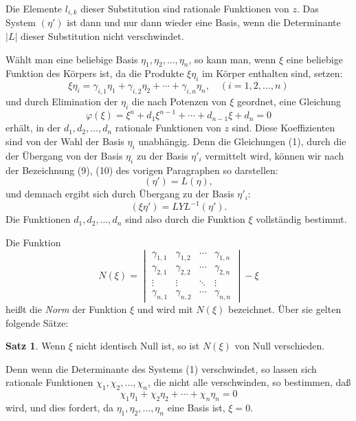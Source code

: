 \documentclass[12pt,a4paper]{article}
\theoremstyle{definition}
\newtheorem{satz}{Satz}[section]
\begin{document}
Die Elemente $l_{i,k}$ dieser Substitution sind rationale Funktionen von $z$. Das System $(\eta')$ ist dann und nur dann wieder eine Basis, wenn die Determinante $|L|$ dieser Substitution nicht verschwindet.

\bigskip

Wählt man eine beliebige Basis $\eta_1, \eta_2, \ldots, \eta_n$, so kann man, wenn $\xi$ eine beliebige Funktion des Körpers ist, da die Produkte $\xi\eta_i$ im Körper enthalten sind, setzen:
\begin{equation}
\xi\eta_i = \gamma_{i,1}\eta_1 + \gamma_{i,2}\eta_2 + \cdots + \gamma_{i,n}\eta_n, \quad (i = 1, 2, \ldots, n)
\end{equation}
und durch Elimination der $\eta_i$ die nach Potenzen von $\xi$ geordnet, eine Gleichung
\begin{equation}
\varphi(\xi) = \xi^n + d_1\xi^{n-1} + \cdots + d_{n-1}\xi + d_n = 0
\end{equation}
erhält, in der $d_1, d_2, \ldots, d_n$ rationale Funktionen von $z$ sind. Diese Koeffizienten sind von der Wahl der Basis $\eta_i$ unabhängig. Denn die Gleichungen (1), durch die der Übergang von der Basis $\eta_i$ zu der Basis $\eta'_i$ vermittelt wird, können wir nach der Bezeichnung (9), (10) des vorigen Paragraphen so darstellen:
\begin{equation}
(\eta') = L(\eta),
\end{equation}
und demnach ergibt sich durch Übergang zu der Basis $\eta'_i$:
\[(\xi\eta') = LYL^{-1}(\eta').\]
Die Funktionen $d_1, d_2, \ldots, d_n$ sind also durch die Funktion $\xi$ vollständig bestimmt.

Die Funktion
\begin{equation}
N(\xi) = \begin{vmatrix}
\gamma_{1,1} & \gamma_{1,2} & \cdots & \gamma_{1,n} \\
\gamma_{2,1} & \gamma_{2,2} & \cdots & \gamma_{2,n} \\
\vdots & \vdots & \ddots & \vdots \\
\gamma_{n,1} & \gamma_{n,2} & \cdots & \gamma_{n,n}
\end{vmatrix} - \xi
\end{equation}
heißt die \emph{Norm} der Funktion $\xi$ und wird mit $N(\xi)$ bezeichnet. Über sie gelten folgende Sätze:

\begin{satz}
Wenn $\xi$ nicht identisch Null ist, so ist $N(\xi)$ von Null verschieden.
\end{satz}
Denn wenn die Determinante des Systems (1) verschwindet, so lassen sich rationale Funktionen $\chi_1, \chi_2, \ldots, \chi_n$, die nicht alle verschwinden, so bestimmen, daß
\[\chi_1\eta_1 + \chi_2\eta_2 + \cdots + \chi_n\eta_n = 0\]
wird, und dies fordert, da $\eta_1, \eta_2, \ldots, \eta_n$ eine Basis ist, $\xi = 0$.
\end{document}
